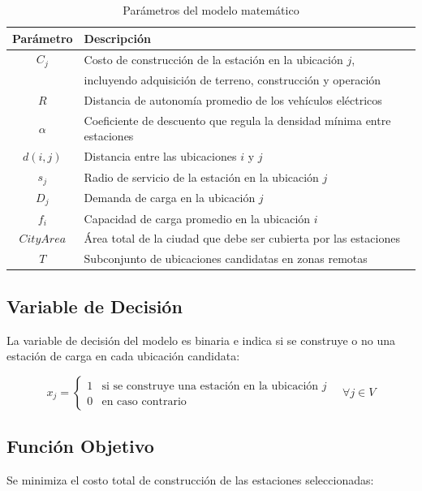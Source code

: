 \documentclass[letter, 10pt]{article}
\begin{document}
\begin{table}[h]
\centering
\caption{Parámetros del modelo matemático}
\label{tab:parametros}
\begin{tabular}{cl}
\hline
\textbf{Parámetro} & \textbf{Descripción} \\
\hline
$C_j$       & Costo de construcción de la estación en la ubicación $j$, \\
            & incluyendo adquisición de terreno, construcción y operación \\
$R$         & Distancia de autonomía promedio de los vehículos eléctricos \\
$\alpha$    & Coeficiente de descuento que regula la densidad mínima entre estaciones \\
$d(i,j)$   & Distancia entre las ubicaciones $i$ y $j$ \\
$s_j$       & Radio de servicio de la estación en la ubicación $j$ \\
$D_j$       & Demanda de carga en la ubicación $j$ \\
$f_i$       & Capacidad de carga promedio en la ubicación $i$ \\
$\mathit{CityArea}$ & Área total de la ciudad que debe ser cubierta por las estaciones \\
$T$         & Subconjunto de ubicaciones candidatas en zonas remotas \\
\hline
\end{tabular}
\end{table}

\subsection{Variable de Decisión}

La variable de decisión del modelo es binaria e indica si se construye o no una estación 
de carga en cada ubicación candidata:

\[
x_j = \begin{cases} 1 & \text{si se construye una estación en la ubicación } j \\ 
0 & \text{en caso contrario} \end{cases} \quad \forall j \in V
\]

\subsection{Función Objetivo}

Se minimiza el costo total de construcción de las estaciones seleccionadas:
\end{document}
